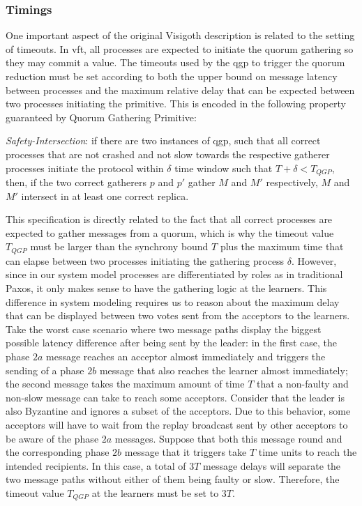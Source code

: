 \subsubsection{Timings}

One important aspect of the original Visigoth description is related to the setting of timeouts. In \acrshort{vft}, all processes are expected to initiate the quorum gathering so they may commit a value. The timeouts used by the \acrlong{qgp} to trigger the quorum reduction must be set according to both the upper bound on message latency between processes and the maximum relative delay that can be expected between two processes initiating the primitive. This is encoded in the following property guaranteed by Quorum Gathering Primitive: \par

\begin{displayquote}
\textit{Safety-Intersection}: if there are two instances of \acrshort{qgp}, such that all correct processes that are not crashed and not slow towards the respective gatherer processes initiate the protocol within $\delta$ time window such that $T+\delta < T_{QGP}$, then, if the two correct gatherers $p$ and $p'$ gather $M$ and $M'$ respectively, $M$ and $M'$ intersect in at least one correct replica.
\end{displayquote}

This specification is directly related to the fact that all correct processes are expected to gather messages from a quorum, which is why the timeout value $T_{QGP}$ must be larger than the synchrony bound $T$ plus the maximum time that can elapse between two processes initiating the gathering process $\delta$. However, since in our system model processes are differentiated by roles as in traditional Paxos, it only makes sense to have the gathering logic at the learners. This difference in system modeling requires us to reason about the maximum delay that can be displayed between two votes sent from the acceptors to the learners. Take the worst case scenario where two message paths display the biggest possible latency difference after being sent by the leader: in the first case, the phase $2a$ message reaches an acceptor almost immediately and triggers the sending of a phase $2b$ message that also reaches the learner almost immediately; the second message takes the maximum amount of time $T$ that a non-faulty and non-slow message can take to reach some acceptors. Consider that the leader is also Byzantine and ignores a subset of the acceptors. Due to this behavior, some acceptors will have to wait from the replay broadcast sent by other acceptors to be aware of the phase $2a$ messages. Suppose that both this message round and the corresponding phase $2b$ message that it triggers take $T$ time units to reach the intended recipients. In this case, a total of $3T$ message delays will separate the two message paths without either of them being faulty or slow. Therefore, the timeout value $T_{QGP}$ at the learners must be set to $3T$.

